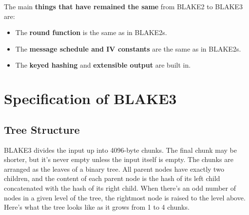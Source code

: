 \documentclass[11pt,notitlepage,a4paper]{article}
\newcommand{\name}{BLAKE3\xspace}
\begin{document}
The main \textbf{things that have remained the same} from BLAKE2 to BLAKE3 are:

\begin{itemize}
\item The \textbf{round function} is the same as in BLAKE2s.
\item The \textbf{message schedule and IV constants} are the same as in BLAKE2s.
\item The \textbf{keyed hashing} and \textbf{extensible output} are built in.
\end{itemize}

\nocite{DBLP:journals/iacr/AumassonNWW13,DBLP:journals/rfc/rfc7693,DBLP:journals/tosc/LuykxMN16}

\section{Specification of \name}\label{sec:specification}

\subsection{Tree Structure}\label{sec:tree}

\name divides the input up into 4096-byte chunks. The final chunk may be shorter, but it's never empty unless the input itself is empty. The chunks are arranged as the leaves of a binary tree. All parent nodes have exactly two children, and the content of each parent node is the hash of its left child concatenated with the hash of its right child. When there's an odd number of nodes in a given level of the tree, the rightmost node is raised to the level above. Here's what the tree looks like as it grows from 1 to 4 chunks.
\end{document}
